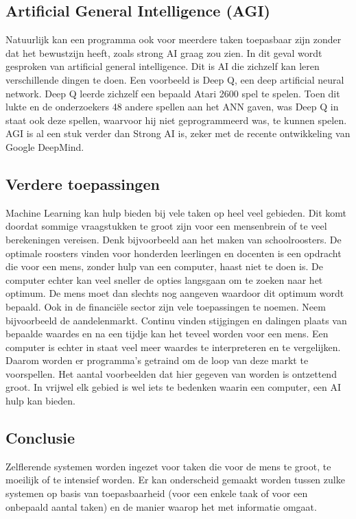 \subsection{Artificial General Intelligence (AGI)}
Natuurlijk kan een programma ook voor meerdere taken toepasbaar zijn zonder dat het bewustzijn heeft, zoals strong AI graag zou zien. In dit geval wordt gesproken van artificial general intelligence. Dit is AI die zichzelf kan leren verschillende dingen te doen. Een voorbeeld is Deep Q, een deep artificial neural network. Deep Q leerde zichzelf een bepaald Atari 2600 spel te spelen. Toen dit lukte en de onderzoekers 48 andere spellen aan het ANN gaven, was Deep Q in staat ook deze spellen, waarvoor hij niet geprogrammeerd was, te kunnen spelen. \cite{DeepQ}
AGI is al een stuk verder dan Strong AI is, zeker met de recente ontwikkeling van Google DeepMind. \cite{DeepMind1}

\subsection{Verdere toepassingen}
Machine Learning kan hulp bieden bij vele taken op heel veel gebieden. Dit komt doordat sommige vraagstukken te groot zijn voor een mensenbrein of te veel berekeningen vereisen. Denk bijvoorbeeld aan het maken van schoolroosters. De optimale roosters vinden voor honderden leerlingen en docenten is een opdracht die voor een mens, zonder hulp van een computer, haast niet te doen is. De computer echter kan veel sneller de opties langsgaan om te zoeken naar het optimum. De mens moet dan slechts nog aangeven waardoor dit optimum wordt bepaald.
Ook in de financiële sector zijn vele toepassingen te noemen. Neem bijvoorbeeld de aandelenmarkt. Continu vinden stijgingen en dalingen plaats van bepaalde waardes en na een tijdje kan het teveel worden voor een mens. Een computer is echter in staat veel meer waardes te interpreteren en te vergelijken. Daarom worden er programma’s getraind om de loop van deze markt te voorspellen.
Het aantal voorbeelden dat hier gegeven van worden is ontzettend groot. In vrijwel elk gebied is wel iets te bedenken waarin een computer, een AI hulp kan bieden.

\subsection{Conclusie}
Zelflerende systemen worden ingezet voor taken die voor de mens te groot, te moeilijk of te intensief worden. Er kan onderscheid gemaakt worden tussen zulke systemen op basis van toepasbaarheid (voor een enkele taak of voor een onbepaald aantal taken) en de manier waarop het met informatie omgaat.